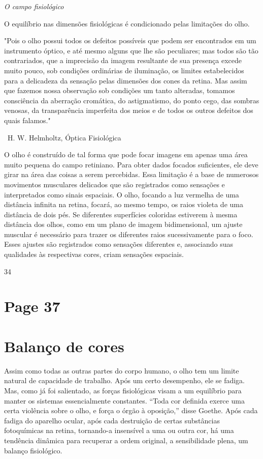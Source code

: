 \documentclass[a4paper]{article}
\begin{document}
\vspace{1em}

\textit{O campo fisiológico}

O equilíbrio nas dimensões fisiológicas é condicionado pelas limitações do olho.

"Pois o olho possui todos os defeitos possíveis que podem ser encontrados em um instrumento óptico, e até mesmo alguns que lhe são peculiares; mas todos são tão contrariados, que a imprecisão da imagem resultante de sua presença excede muito pouco, sob condições ordinárias de iluminação, os limites estabelecidos para a delicadeza da sensação pelas dimensões dos cones da retina. Mas assim que fazemos nossa observação sob condições um tanto alteradas, tomamos consciência da aberração cromática, do astigmatismo, do ponto cego, das sombras venosas, da transparência imperfeita dos meios e de todos os outros defeitos dos quais falamos."

\textbullet \ H. W. Helmholtz, Óptica Fisiológica

O olho é construído de tal forma que pode focar imagens em apenas uma área muito pequena do campo retiniano. Para obter dados focados suficientes, ele deve girar na área das coisas a serem percebidas. Essa limitação é a base de numerosos movimentos musculares delicados que são registrados como sensações e interpretados como sinais espaciais. O olho, focando a luz vermelha de uma distância infinita na retina, focará, ao mesmo tempo, os raios violeta de uma distância de dois pés. Se diferentes superfícies coloridas estiverem à mesma distância dos olhos, como em um plano de imagem bidimensional, um ajuste muscular é necessário para trazer os diferentes raios sucessivamente para o foco. Esses ajustes são registrados como sensações diferentes e, associando suas qualidades às respectivas cores, criam sensações espaciais.

34

\newpage
\section*{Page 37}

\section*{Balanço de cores}

Assim como todas as outras partes do corpo humano, o olho tem um limite natural de capacidade de trabalho. Após um certo desempenho, ele se fadiga. Mas, como já foi salientado, as forças fisiológicas visam a um equilíbrio para manter os sistemas essencialmente constantes. ``Toda cor definida exerce uma certa violência sobre o olho, e força o órgão à oposição,'' disse Goethe. Após cada fadiga do aparelho ocular, após cada destruição de certas substâncias fotoquímicas na retina, tornando-a insensível a uma ou outra cor, há uma tendência dinâmica para recuperar a ordem original, a sensibilidade plena, um balanço fisiológico.
\end{document}
